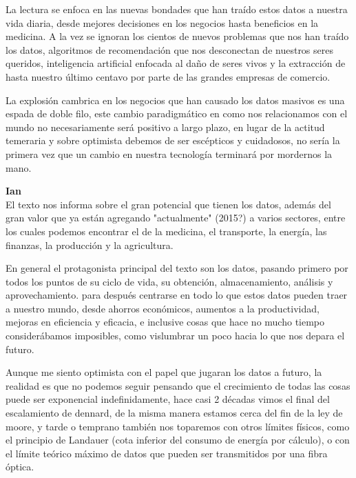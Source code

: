 \documentclass[12pt,a4paper]{article}
\begin{document}
\begin{enumerate}
\begin{enumerate}
				La lectura se enfoca en las nuevas bondades que han traído
				estos datos a nuestra vida diaria, desde mejores decisiones en los
				negocios hasta beneficios en la medicina.
				A la vez se ignoran los cientos de nuevos problemas que nos han traído
				los datos, algoritmos de recomendación que nos desconectan de nuestros
				seres queridos, inteligencia artificial enfocada al daño de seres
				vivos y la extracción de hasta nuestro último centavo por parte
				de las grandes empresas de comercio.

				La explosión cambrica en los negocios que han causado
				los datos masivos es una espada de doble filo, este cambio
				paradigmático en como nos relacionamos con el mundo no necesariamente
				será positivo a largo plazo, en lugar de la actitud temeraria y
				sobre optimista debemos de ser escépticos y cuidadosos, no
				sería la primera vez que un cambio en nuestra tecnología
				terminará por mordernos la mano.

				\textbf{Ian}\\
				El texto nos informa sobre el gran potencial que tienen los datos, 
				además del gran valor que ya están agregando "actualmente" (2015?) 
				a varios sectores, entre los cuales podemos encontrar el de la medicina, 
				el transporte, la energía, las finanzas, la producción y la agricultura.

				En general el protagonista principal del texto son los datos, pasando
				primero por todos los puntos de su ciclo de vida, su obtención, 
				almacenamiento, análisis y aprovechamiento. para después centrarse 
				en todo lo que estos datos pueden traer a nuestro mundo, desde ahorros 
				económicos, aumentos a la productividad, mejoras en eficiencia y 
				eficacia, e inclusive cosas que hace no mucho tiempo considerábamos 
				imposibles, como vislumbrar un poco hacia lo que nos depara el futuro.

				Aunque me siento optimista con el papel que jugaran los datos a 
				futuro, la realidad es que no podemos seguir pensando que el
				crecimiento de todas las cosas puede ser exponencial indefinidamente, 
				hace casi 2 décadas vimos el final del escalamiento de dennard, 
				de la misma manera estamos cerca del fin de la ley de moore, y tarde
				o temprano también nos toparemos con otros límites físicos, como el 
				principio de Landauer (cota inferior del consumo de energía por
				cálculo), o con el límite teórico máximo de datos que pueden ser
				transmitidos por una fibra óptica.


\end{enumerate}
\end{enumerate}
\end{document}

